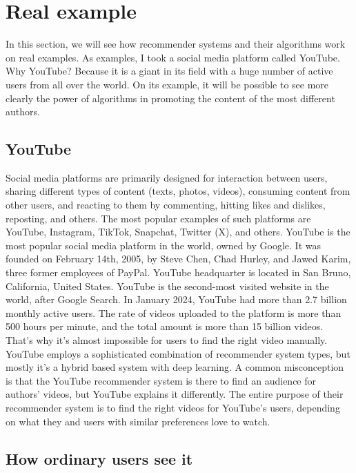 \documentclass[12pt]{article}
\begin{document}
\section{Real example}

In this section, we will see how recommender systems and their algorithms work on real examples. As examples, I took a social media platform called YouTube. Why YouTube? Because it is a giant in its field with a huge number of active users from all over the world. On its example, it will be possible to see more clearly the power of algorithms in promoting the content of the most different authors.

\subsection{YouTube}

Social media platforms are primarily designed for interaction between users, sharing different types of content (texts, photos, videos), consuming content from other users, and reacting to them by commenting, hitting likes and dislikes, reposting, and others. The most popular examples of such platforms are YouTube, Instagram, TikTok, Snapchat, Twitter (X), and others.
YouTube is the most popular social media platform in the world, owned by Google. It was founded on February 14th, 2005, by Steve Chen, Chad Hurley, and Jawed Karim, three former employees of PayPal. YouTube headquarter is located in San Bruno, California, United States. YouTube is the second-most visited website in the world, after Google Search. In January 2024, YouTube had more than 2.7 billion monthly active users. The rate of videos uploaded to the platform is more than 500 hours per minute, and the total amount is more than 15 billion videos. That's why it's almost impossible for users to find the right video manually.
YouTube employs a sophisticated combination of recommender system types, but mostly it’s a hybrid based system with deep learning. A common misconception is that the YouTube recommender system is there to find an audience for authors' videos, but YouTube explains it differently. The entire purpose of their recommender system is to find the right videos for YouTube’s users, depending on what they and users with similar preferences love to watch.
\cite{3.1}
\subsection{How ordinary users see it}
\end{document}
